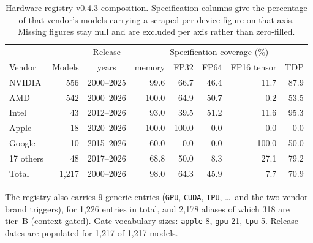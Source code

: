 \begin{table}[t]
\centering\small
\caption{Hardware registry v0.4.3 composition. Specification columns give the percentage of that vendor's models carrying a scraped per-device figure on that axis. Missing figures stay null and are excluded per axis rather than zero-filled.}
\label{tab:registry-composition}
\begin{tabular}{l r c r r r r r}
\hline
 & & Release & \multicolumn{5}{c}{Specification coverage (\%)} \\
Vendor & Models & years & memory & FP32 & FP64 & FP16 tensor & TDP \\
\hline
NVIDIA & 556 & 2000--2025 & 99.6 & 66.7 & 46.4 & 11.7 & 87.9 \\
AMD & 542 & 2000--2026 & 100.0 & 64.9 & 50.7 & 0.2 & 53.5 \\
Intel & 43 & 2012--2026 & 93.0 & 39.5 & 51.2 & 11.6 & 95.3 \\
Apple & 18 & 2020--2026 & 100.0 & 100.0 & 0.0 & 0.0 & 0.0 \\
Google & 10 & 2015--2026 & 60.0 & 0.0 & 0.0 & 100.0 & 50.0 \\
17 others & 48 & 2017--2026 & 68.8 & 50.0 & 8.3 & 27.1 & 79.2 \\
\hline
Total & 1,217 & 2000--2026 & 98.0 & 64.3 & 45.9 & 7.7 & 70.9 \\
\hline
\end{tabular}

\vspace{0.5em}
\parbox{\linewidth}{\small The registry also carries 9 generic entries (\texttt{GPU}, \texttt{CUDA}, \texttt{TPU}, \ldots\ and the two vendor brand triggers), for 1,226 entries in total, and 2,178 aliases of which 318 are tier~B (context-gated). Gate vocabulary sizes: \texttt{apple} 8, \texttt{gpu} 21, \texttt{tpu} 5. Release dates are populated for 1,217 of 1,217 models.}
\end{table}
